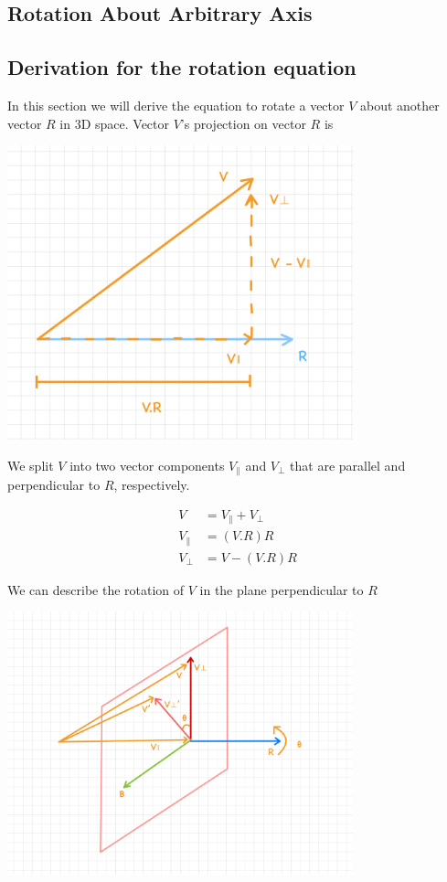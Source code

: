 \documentclass{article}
\begin{document}
    \begin{center}
        \section*{Rotation About Arbitrary Axis}
    \end{center}

    \subsection*{Derivation for the rotation equation}
    
    In this section we will derive the equation to rotate a vector $V$ about another vector $R$ in 3D space. Vector $V$'s projection
    on vector $R$ is

    \includegraphics[width=0.75\textwidth]{../images/VectorProjection.jpg}

    \noindent We split $V$ into two vector components $V_{\parallel}$ and $V_{\perp}$ that are parallel and perpendicular to $R$, respectively.

    \begin{align}
        V &= V_{\parallel} + V_{\perp} \\
        V_{\parallel} &= (V.R) R \label{eq:vparallel} \\
        V_{\perp} &= V - (V.R) R \label{eq:vperp}
    \end{align}

    We can describe the rotation of $V$ in the plane perpendicular to $R$

    \includegraphics[width=0.75\textwidth]{../images/Rotation_About_ArbitraryAxis.jpg}
\end{document}
